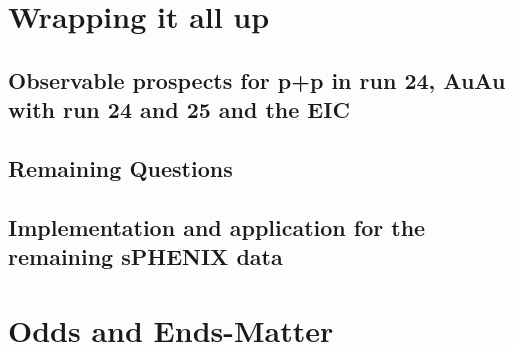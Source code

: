 \documentclass[letterpaper, 12pt, oneside]{book}
\theoremstyle{definition}
\begin{document}
\part{Wrapping it all up}
\chapter{Observable prospects for p+p in run 24, AuAu with run 24 and 25 and the EIC}
\label{ch:furture_prospects}
\chapter{Remaining Questions}
\chapter{Implementation and application for the remaining sPHENIX data}
\singlespacing
\part{Odds and Ends-Matter}
\printbibliography
%
%
\begin{appendices}
	
\end{appendices}
\end{document}
